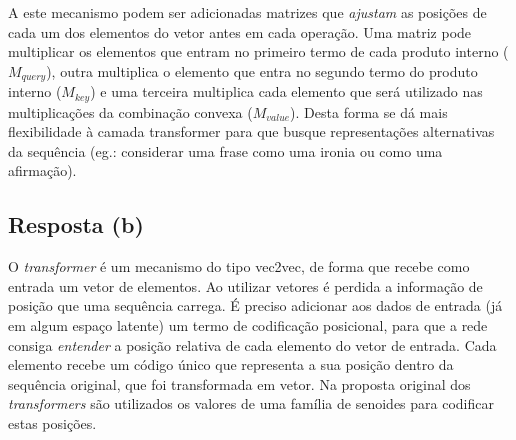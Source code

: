 \documentclass[final,3p]{elsarticle}
\numberwithin{equation}{section}
\begin{document}
        A este mecanismo podem ser adicionadas matrizes que \emph{ajustam} as posições de cada um dos elementos do vetor antes em cada operação. Uma matriz pode multiplicar os elementos que entram no primeiro termo de cada produto interno ($M_{query}$), outra multiplica o elemento que entra no segundo termo do produto interno ($M_{key}$) e uma terceira multiplica cada elemento que será utilizado nas multiplicações da combinação convexa ($M_{value}$). Desta forma se dá mais flexibilidade à camada transformer para que busque representações alternativas da sequência (eg.: considerar uma frase como uma ironia ou como uma afirmação).

    \subsection{Resposta \textbf{(b)}}

        O \emph{transformer} é um mecanismo do tipo vec2vec, de forma que recebe como entrada um vetor de elementos. Ao utilizar vetores é perdida a informação de posição que uma sequência carrega. É preciso adicionar aos dados de entrada (já em algum espaço latente) um termo de codificação posicional, para que a rede consiga \emph{entender} a posição relativa de cada elemento do vetor de entrada. Cada elemento recebe um código único que representa a sua posição dentro da sequência original, que foi transformada em vetor. Na proposta original dos \emph{transformers} são utilizados os valores de uma família de senoides para codificar estas posições.



% 
% 





\end{document}

